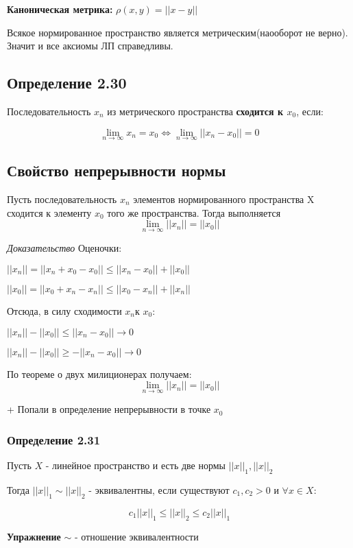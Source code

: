 \documentclass[12pt]{article}
\begin{document}
		\textbf{Каноническая метрика:} $\rho(x,y) = ||x-y||$
		
		Всякое нормированное пространство является метрическим(наооборот не верно). Значит и все аксиомы ЛП справедливы.
		
\subsection*{Определение 2.30}\label{eq103}
	
	Последовательность ${x_n}$ из метрического пространства \textbf{сходится к $x_0$}, если:
	
	$$\lim_{n \to \infty} x_n = x_0 \Leftrightarrow \lim_{n \to \infty} ||x_n - x_0|| = 0$$
	
\subsection*{Свойство непрерывности нормы}\label{eq100}
	Пусть последовательность ${x_n}$ элементов нормированного пространства X сходится к элементу $x_0$ того же пространства. Тогда выполняется	
	$$\lim_{n \to \infty} ||x_n|| = ||x_0||$$
		
\textit{Доказательство}		
	Оценочки:
	
	$||x_n|| = ||x_n + x_0 - x_0|| \leq ||x_n - x_0|| + ||x_0||$
	
	$||x_0|| = ||x_0 + x_n - x_n|| \leq ||x_0 - x_n|| + ||x_n||$
	
	Отсюда, в силу сходимости ${x_n}$к $x_0$:
	
	$||x_n|| - ||x_0|| \leq ||x_n - x_0|| \to 0 $
	
	$||x_n|| - ||x_0|| \ge -||x_n - x_0|| \to 0$
	
	По теореме о двух милиционерах получаем: 	$$\lim_{n \to \infty} ||x_n|| = ||x_0||$$
	
	+ Попали в определение непрерывности в точке $x_0$
	
\subsubsection*{Определение 2.31}
	Пусть $X$ - линейное пространство и есть две нормы $||x||_1, ||x||_2$
	
Тогда $||x||_1 \sim ||x||_2$ - эквивалентны, если существуют $c_1, c_2 > 0$ и $\forall x \in X$:

	$$c_1||x||_1 \leq ||x||_2 \leq c_2||x||_1$$
		
\textbf{Упражнение}		
	$\sim$ - отношение эквивалентности
\end{document}
